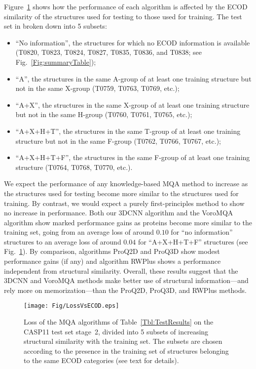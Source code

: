 Figure~\ref{Fig:LossVsECOD} shows how the performance of each
algorithm is affected by the ECOD similarity of the structures used
for testing to those used for training. The test set in broken down
into 5 subsets:
\begin{itemize}
\item
``No information'', the structures for which no ECOD information is
available (T0820, T0823, T0824, T0827, T0835, T0836, and T0838; see
Fig.~\ref{Fig:summaryTable});
\item
``A'', the structures in the same A-group of at least one training
structure but not in the same X-group (T0759, T0763, T0769, etc.);
\item
``A+X'', the structures in the same X-group of at least one training
structure but not in the same H-group (T0760, T0761, T0765, etc.);
\item
``A+X+H+T'', the structures in the same T-group of at least one
training structure but not in the same F-group (T0762, T0766, T0767,
etc.);
\item
``A+X+H+T+F'', the structures in the same F-group of at least one
training structure (T0764, T0768, T0770, etc.).
\end{itemize}
%
%
We expect the performance of any knowledge-based MQA method to
increase as the structures used for testing become more similar to the
structures used for training. By contrast, we would expect a purely
first-principles method to show no increase in performance.
%
Both our 3DCNN algorithm and the VoroMQA algorithm show marked
performance gains as proteins become more similar to the training set,
going from an average loss of around $0.10$ for ``no information''
structures to an average loss of around $0.04$ for ``A+X+H+T+F''
structures (see Fig.~\ref{Fig:LossVsECOD}).
%
By comparison, algorithms ProQ2D and ProQ3D show modest performance
gains (if any) and algorithm RWPlus shows a performance independent
from structural similarity.
%
Overall, these results suggest that the 3DCNN and VoroMQA methods make
better use of structural information---and rely more on
memorization---than the ProQ2D, ProQ3D, and RWPlus methods.


\begin{figure}[H]
    \centering
    \texttt{[image: Fig/LossVsECOD.eps]}
%
    \caption{Loss of the MQA algorithms of Table~\ref{Tbl:TestResults}
    on the CASP11 test set stage~2, divided into 5 subsets of
    increasing structural similarity with the training set. The
    subsets are chosen according to the presence in the training set
    of structures belonging to the same ECOD categories (see text for
    details).}
%
    \label{Fig:LossVsECOD}
\end{figure}
